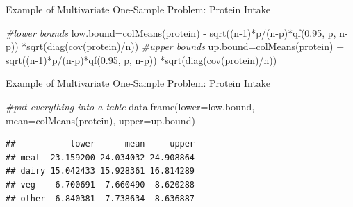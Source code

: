 \documentclass[
  ignorenonframetext,
]{beamer}
\newenvironment{Shaded}{\begin{snugshade}}{\end{snugshade}}
\newcommand{\AttributeTok}[1]{\textcolor[rgb]{0.77,0.63,0.00}{#1}}
\newcommand{\CommentTok}[1]{\textcolor[rgb]{0.56,0.35,0.01}{\textit{#1}}}
\newcommand{\DecValTok}[1]{\textcolor[rgb]{0.00,0.00,0.81}{#1}}
\newcommand{\FloatTok}[1]{\textcolor[rgb]{0.00,0.00,0.81}{#1}}
\newcommand{\FunctionTok}[1]{\textcolor[rgb]{0.00,0.00,0.00}{#1}}
\newcommand{\NormalTok}[1]{#1}
\newcommand{\OtherTok}[1]{\textcolor[rgb]{0.56,0.35,0.01}{#1}}
\newcommand{\SpecialCharTok}[1]{\textcolor[rgb]{0.00,0.00,0.00}{#1}}
\begin{document}
\begin{frame}[fragile]{Example of Multivariate One-Sample Problem:
Protein Intake}
\begin{Shaded}
\begin{Highlighting}[]
\CommentTok{\#lower bounds}
\NormalTok{low.bound}\OtherTok{=}\FunctionTok{colMeans}\NormalTok{(protein) }\SpecialCharTok{{-}} \FunctionTok{sqrt}\NormalTok{((n}\DecValTok{{-}1}\NormalTok{)}\SpecialCharTok{*}\NormalTok{p}\SpecialCharTok{/}\NormalTok{(n}\SpecialCharTok{{-}}\NormalTok{p)}\SpecialCharTok{*}\FunctionTok{qf}\NormalTok{(}\FloatTok{0.95}\NormalTok{, p, n}\SpecialCharTok{{-}}\NormalTok{p)) }\SpecialCharTok{*}\FunctionTok{sqrt}\NormalTok{(}\FunctionTok{diag}\NormalTok{(}\FunctionTok{cov}\NormalTok{(protein)}\SpecialCharTok{/}\NormalTok{n))}
\CommentTok{\#upper bounds}
\NormalTok{up.bound}\OtherTok{=}\FunctionTok{colMeans}\NormalTok{(protein) }\SpecialCharTok{+} \FunctionTok{sqrt}\NormalTok{((n}\DecValTok{{-}1}\NormalTok{)}\SpecialCharTok{*}\NormalTok{p}\SpecialCharTok{/}\NormalTok{(n}\SpecialCharTok{{-}}\NormalTok{p)}\SpecialCharTok{*}\FunctionTok{qf}\NormalTok{(}\FloatTok{0.95}\NormalTok{, p, n}\SpecialCharTok{{-}}\NormalTok{p)) }\SpecialCharTok{*}\FunctionTok{sqrt}\NormalTok{(}\FunctionTok{diag}\NormalTok{(}\FunctionTok{cov}\NormalTok{(protein)}\SpecialCharTok{/}\NormalTok{n))}
\end{Highlighting}
\end{Shaded}

\normalsize
\end{frame}

\begin{frame}[fragile]{Example of Multivariate One-Sample Problem:
Protein Intake}
\protect\hypertarget{example-of-multivariate-one-sample-problem-protein-intake-7}{}
\begin{Shaded}
\begin{Highlighting}[]
\CommentTok{\#put everything into a table}
\FunctionTok{data.frame}\NormalTok{(}\AttributeTok{lower=}\NormalTok{low.bound, }\AttributeTok{mean=}\FunctionTok{colMeans}\NormalTok{(protein), }
           \AttributeTok{upper=}\NormalTok{up.bound)}
\end{Highlighting}
\end{Shaded}

\begin{verbatim}
##           lower      mean     upper
## meat  23.159200 24.034032 24.908864
## dairy 15.042433 15.928361 16.814289
## veg    6.700691  7.660490  8.620288
## other  6.840381  7.738634  8.636887
\end{verbatim}
\end{frame}
\end{document}
